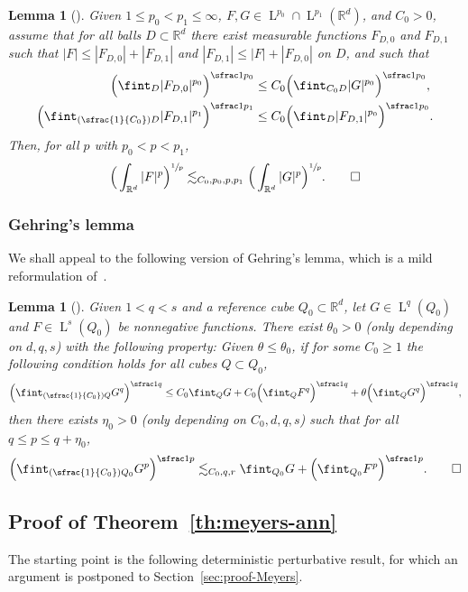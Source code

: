 \documentclass[JEP,XML,SOM,Unicode,published]{cedram}
\newcommand{\Psfrac}[2]{(\sfrac{#1}{#2})}
\theoremstyle{plain}
\newtheorem{lem}[theor]{Lemma}
\theoremstyle{definition}
\newcommand{\R}{\mathbb R}
\newcommand{\Ld}{\operatorname{L}}
\begin{document}
\begin{lem}[\cite{Shen-07}]\label{lem:Shen}
Given $1\le p_0<p_1\le\infty$, $F,G\in\Ld^{p_0}\cap\Ld^{p_1}(\R^d)$, and $C_0>0$, assume that for all balls $D\subset \R^d$ there exist measurable functions $F_{D,0}$ and $F_{D,1}$ such that \mbox{$|F|\le |F_{D,0}|+|F_{D,1}|$} and $|F_{D,1}|\le |F|+|F_{D,0}|$ on $D$, and such that
\begin{align*}
\Big(\fint_{D}|F_{D,0}|^{p_0}\Big)^{\sfrac1{p_0}}&\le C_0\Big(\fint_{C_0D}|G|^{p_0}\Big)^{\sfrac1{p_0}},\\
\Big(\fint_{\Psfrac1{C_0}D}|F_{D,1}|^{p_1}\Big)^{\sfrac1{p_1}}&\le C_0\Big(\fint_{D}|F_{D,1}|^{p_0}\Big)^{\sfrac1{p_0}}.
\end{align*}
Then,
for all $p$ with $p_0<p<p_1$,
\[\Big(\int_{\R^d}|F|^p\Big)^{\sfrac1p}\lesssim_{C_0,p_0,p,p_1}\Big(\int_{\R^d}|G|^p\Big)^{\sfrac1p}.\qedhere\]
\end{lem}

\subsubsection{Gehring's lemma}
We shall appeal to the following version of Gehring's lemma, which is a mild reformulation of~\cite[Prop.\,5.1]{GiaMo}.

\begin{lem}[\cite{Gehring,GiaMo}]\label{lem:Gehring}
Given $1<q<s$ and a reference cube $Q_0\subset\R^d$, let $G\in\Ld^q(Q_0)$ and $F\in\Ld^s(Q_0)$ be nonnegative functions.
There exist $\theta_0>0$ (only depending on $d,q,s$) with the following property:
Given $\theta\le\theta_0$, if for some $C_0\ge1$ the following condition holds for all cubes $Q\subset Q_0$,
\[\Big(\fint_{\Psfrac1{C_0}Q}G^q\Big)^{\sfrac1q}\le C_0\fint_{Q}G+C_0\Big(\fint_{Q}F^q\Big)^{\sfrac1q}+\theta\Big(\fint_{Q}G^q\Big)^{\sfrac1q},\]
then there exists $\eta_0>0$ (only depending on $C_0,d,q,s$) such that for all $q\le p\le q+\eta_0$,
\[\Big(\fint_{\Psfrac1{C_0}Q_0}G^p\Big)^{\sfrac1p}\lesssim_{C_0,q,r}\fint_{Q_0}G+\Big(\fint_{Q_0}F^p\Big)^{\sfrac1p}.\qedhere\]
\end{lem}

\subsection{Proof of Theorem~\ref{th:meyers-ann}}
The starting point is the following deterministic perturbative result, for which an argument is postponed to Section~\ref{sec:proof-Meyers}.
\end{document}
